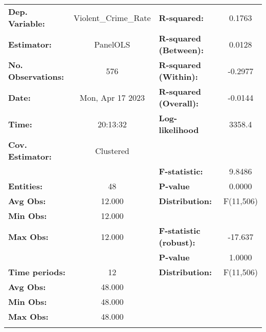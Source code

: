 \begin{center}
\begin{tabular}{lclc}
\toprule
\textbf{Dep. Variable:}           & Violent\_Crime\_Rate & \textbf{  R-squared:         }   &      0.1763      \\
\textbf{Estimator:}               &       PanelOLS       & \textbf{  R-squared (Between):}  &      0.0128      \\
\textbf{No. Observations:}        &         576          & \textbf{  R-squared (Within):}   &     -0.2977      \\
\textbf{Date:}                    &   Mon, Apr 17 2023   & \textbf{  R-squared (Overall):}  &     -0.0144      \\
\textbf{Time:}                    &       20:13:32       & \textbf{  Log-likelihood     }   &      3358.4      \\
\textbf{Cov. Estimator:}          &      Clustered       & \textbf{                     }   &                  \\
\textbf{}                         &                      & \textbf{  F-statistic:       }   &      9.8486      \\
\textbf{Entities:}                &          48          & \textbf{  P-value            }   &      0.0000      \\
\textbf{Avg Obs:}                 &        12.000        & \textbf{  Distribution:      }   &    F(11,506)     \\
\textbf{Min Obs:}                 &        12.000        & \textbf{                     }   &                  \\
\textbf{Max Obs:}                 &        12.000        & \textbf{  F-statistic (robust):} &     -17.637      \\
\textbf{}                         &                      & \textbf{  P-value            }   &      1.0000      \\
\textbf{Time periods:}            &          12          & \textbf{  Distribution:      }   &    F(11,506)     \\
\textbf{Avg Obs:}                 &        48.000        & \textbf{                     }   &                  \\
\textbf{Min Obs:}                 &        48.000        & \textbf{                     }   &                  \\
\textbf{Max Obs:}                 &        48.000        & \textbf{                     }   &                  \\
\textbf{}                         &                      & \textbf{                     }   &                  \\

\end{tabular}
\end{center}
